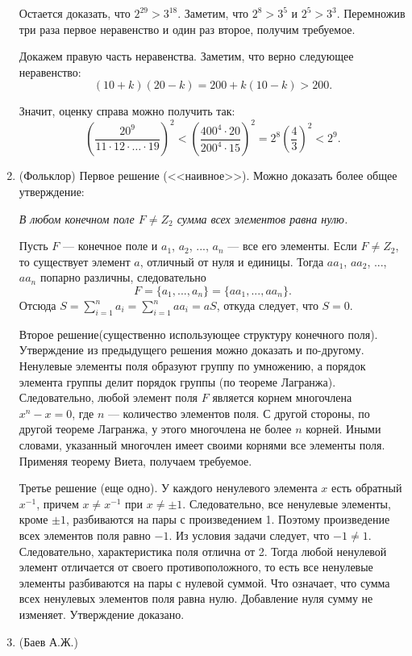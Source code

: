 \documentclass[12pt, a4paper]{article}
\begin{document}
\begin{enumerate}
Остается доказать, что $2^{29} > 3^{18}$. Заметим, что $2^8>3^5$ и $2^5>3^3$. Перемножив три раза первое неравенство и один раз второе, получим требуемое.

Докажем правую часть неравенства. Заметим, что верно следующее неравенство:
$$(10+k) (20-k) = 200 + k (10 - k) > 200.$$

Значит, оценку справа можно получить так:
$$\left( \frac{20^9}{11 \cdot 12 \cdot \ldots \cdot 19} \right)^2 < \left( \frac{400^4 \cdot 20}{200^4 \cdot 15} \right)^2 = 2^8 \left( \frac{4}{3} \right)^2 < 2^9.$$


\item (Фольклор) Первое решение (<<наивное>>). Можно доказать более общее утверждение:

\textit{В любом конечном поле $F \ne Z_2$ сумма всех элементов равна нулю.}

Пусть $F$ --- конечное поле и $a_1$, $a_2$, ..., $a_n$ --- все его элементы. Если $F \ne Z_2$, то существует элемент $a$, отличный от нуля и единицы. Тогда $a a_1$, $a a_2$, ..., $a a_n$ попарно различны, следовательно
$$F = \{ a_1, ..., a_n \} = \{ a a_1, ..., a a_n \} .$$
Отсюда $S = \sum_{i=1}^{n} a_i = \sum_{i=1}^n a a_i = a S$, откуда следует, что $S = 0$.

Второе решение(существенно использующее структуру конечного поля). Утверждение из предыдущего решения можно доказать и по-другому. Ненулевые элементы поля образуют группу по умножению, а порядок элемента группы делит порядок группы (по теореме  Лагранжа). Следовательно, любой элемент поля $F$ является корнем многочлена $x^n - x = 0$, где $n$ --- количество элементов поля. С другой стороны, по другой теореме Лагранжа, у этого многочлена не более $n$ корней. Иными словами, указанный многочлен имеет своими корнями все элементы поля. Применяя теорему Виета, получаем требуемое. 

Третье решение (еще одно). У каждого ненулевого элемента $x$ есть обратный $x^{-1}$, причем $x \ne x^{-1}$ при $x \ne \pm 1$. Следовательно, все ненулевые элементы, кроме $\pm 1$, разбиваются на пары с произведением 1. Поэтому произведение всех элементов поля равно $-1$. Из условия задачи следует, что $-1 \ne 1$. Следовательно, характеристика поля отлична от 2. Тогда любой ненулевой элемент отличается от своего противоположного, то есть все ненулевые элементы разбиваются на пары с нулевой суммой. Что означает, что сумма всех ненулевых элементов поля равна нулю. Добавление нуля сумму не изменяет. Утверждение доказано.    

\item  (Баев А.Ж.) 


\end{enumerate}
\end{document}
